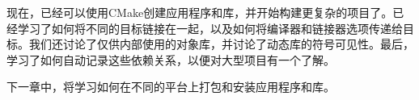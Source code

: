 现在，已经可以使用CMake创建应用程序和库，并开始构建更复杂的项目了。已经学习了如何将不同的目标链接在一起，以及如何将编译器和链接器选项传递给目标。我们还讨论了仅供内部使用的对象库，并讨论了动态库的符号可见性。最后，学习了如何自动记录这些依赖关系，以便对大型项目有一个了解。

下一章中，将学习如何在不同的平台上打包和安装应用程序和库。